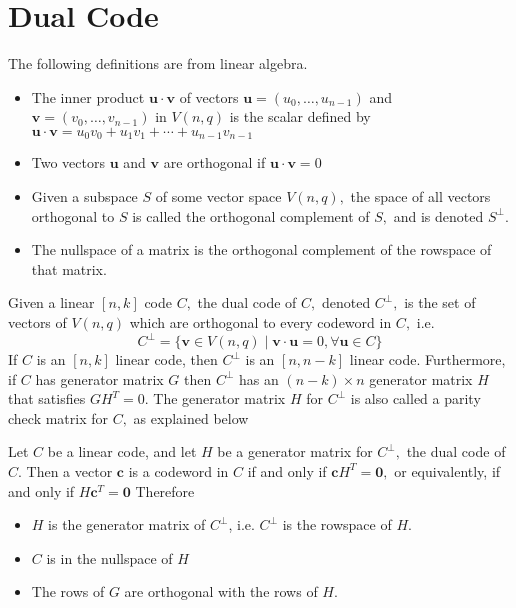 \documentclass[11pt, a4paper]{article}
\begin{document}
\section{Dual Code}
The following definitions are from linear algebra.
\begin{itemize}
\item The inner product $\mathbf{u} \cdot \mathbf{v}$ of vectors $\mathbf{u}=\left(u_{0}, \ldots, u_{n-1}\right)$ and $\mathbf{v}=\left(v_{0}, \ldots, v_{n-1}\right)$ in $V(n, q)$ is the scalar defined by $\mathbf{u} \cdot \mathbf{v}=u_{0} v_{0}+u_{1} v_{1}+\cdots+u_{n-1} v_{n-1}$
\item Two vectors $\mathbf{u}$ and $\mathbf{v}$ are orthogonal if $\mathbf{u} \cdot \mathbf{v}=0$
\item Given a subspace $S$ of some vector space $V(n, q),$ the space of all vectors orthogonal to $S$ is called the orthogonal complement of $S,$ and is denoted $S^{\perp}$.

\item The nullspace of a matrix is the orthogonal complement of the rowspace of that matrix.
\end{itemize}
Given a linear $[n, k]$ code $C,$ the dual code of $C,$ denoted $C^{\perp},$ is the set of vectors of $V(n, q)$ which are orthogonal to every codeword in $C,$ i.e.
$$
C^{\perp}=\{\mathbf{v} \in V(n, q) \mid \mathbf{v} \cdot \mathbf{u}=0, \forall \mathbf{u} \in C\}
$$
If $C$ is an $[n, k]$ linear code, then $C^{\perp}$ is an $[n, n-k]$ linear code. Furthermore, if $C$ has generator matrix $G$ then $C^{\perp}$ has an $(n-k) \times n$ generator matrix $H$ that satisfies $G H^{T}=0 .$ The generator matrix $H$ for $C^{\perp}$ is also called a parity check matrix for $C,$ as explained below

Let $C$ be a linear code, and let $H$ be a generator matrix for $C^{\perp},$ the dual code of $C$. Then a vector $\mathbf{c}$ is a codeword in $C$ if and only if $\mathbf{c} H^{T}=\mathbf{0},$ or equivalently, if and only if $H \mathbf{c}^{T}=\mathbf{0}$
Therefore
\begin{itemize}
\item $H$ is the generator matrix of $C^{\perp}$, i.e. $C^{\perp}$ is the rowspace of $H$.
\item $C$ is in the nullspace of $H$
\item The rows of $G$ are orthogonal with the rows of $H$.
\end{itemize}
\end{document}
